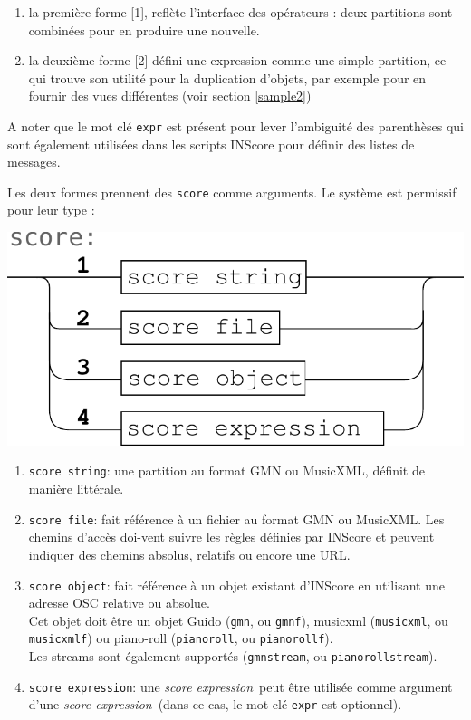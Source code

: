 \documentclass{article}
\newcommand{\OSC}[1]{\texttt{#1}}
\newcommand{\sExpr}{\emph{score expression}}
\begin{document}
\begin{enumerate}
\item la première forme [1], reflète l'interface des opérateurs : deux partitions sont combinées pour en produire une nouvelle.
\item la deuxième forme [2] défini une expression comme une simple partition, ce qui trouve son utilité pour la duplication d'objets, par exemple pour en fournir des vues différentes (voir section \ref{sample2})
\end{enumerate}

A noter que le mot clé \OSC{expr} est présent pour lever l'ambiguité des parenthèses qui sont également utilisées dans les scripts INScore pour définir des listes de messages.

Les deux formes prennent des \OSC{score} comme arguments. Le système est permissif pour leur type :
\begin{center}
\includegraphics[width=0.7\columnwidth]{imgs/syntax2}
\end{center}

\begin{enumerate}
\item \OSC{score string}: une partition au format GMN ou MusicXML, définit de manière littérale.
\item \OSC{score file}:  fait référence à un fichier au format GMN ou MusicXML. Les chemins d'accès doi-vent suivre les règles définies par INScore et peuvent indiquer des chemins absolus, relatifs ou encore une URL.
\item \OSC{score object}:  fait référence à un objet existant d'INScore en utilisant une adresse OSC relative ou absolue.\\ Cet objet doit être un objet Guido (\OSC{gmn}, ou \OSC{gmnf}), musicxml (\OSC{musicxml}, ou \OSC{musicxmlf}) ou piano-roll (\OSC{pianoroll}, ou \OSC{pianorollf}). \\
Les streams sont également supportés (\OSC{gmnstream}, ou \OSC{pianorollstream}).
\item \OSC{score expression}:  une \sExpr\ peut être utilisée comme argument d'une \sExpr\ (dans ce cas, le mot clé \OSC{expr} est optionnel).
\end{enumerate}
\end{document}
